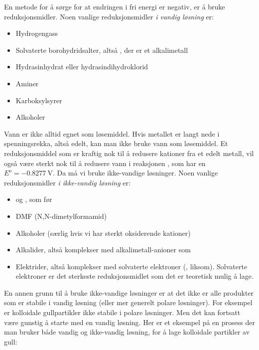 En metode for å sørge for at endringen i fri energi er negativ, er å bruke reduksjonsmidler. Noen vanlige reduksjonsmidler \emph{i vandig løsning} er:
\begin{itemize}
	\item Hydrogengass
	\item Solvaterte borohydridsalter, altså , der  er et alkalimetall
	\item Hydrasinhydrat  eller hydrasindihydro\-klorid \hfill
	\item Aminer
	\item Karboksylsyrer
	\item Alkoholer
\end{itemize}
Vann er ikke alltid egnet som løsemiddel. Hvis metallet er langt nede i spenningsrekka, altså edelt, kan man ikke bruke vann som løsemiddel.  Et reduksjonsmiddel som er kraftig nok til å redusere kationer fra et edelt metall, vil også være sterkt nok til å redusere vann i reaksjonen , som har en $E^o=\SI{-0.8277}{\volt}$. Da må vi bruke ikke-vandige løsninger. Noen vanlige reduksjonsmidler \emph{i ikke-vandig løsning} er:
\begin{itemize}
 	\item {} og , som før
 	\item DMF (N,N-dimetylformamid)
 	\item Alkoholer (særlig hvis vi har sterkt oksiderende kationer)
 	\item Alkalider, altså komplekser med alkalimetall-anioner som 
 	\item Elektrider, altså komplekser med solvaterte elektroner (, liksom). Solvaterte elektroner er det sterkeste reduksjonsmidlet som det er teoretisk mulig å lage.
 \end{itemize}
En annen grunn til å bruke ikke-vandige løsninger er at det ikke er alle produkter som er stabile i vandig løsning (eller mer generelt polare løsninger). For eksempel er kolloidale gullpartikler ikke stabile i polare løsninger. Men det kan fortsatt være gunstig å starte med en vandig løsning. Her er et eksempel på en prosess der man bruker både vandig og ikke-vandig løsning, for å lage kolloidale partikler av gull:
